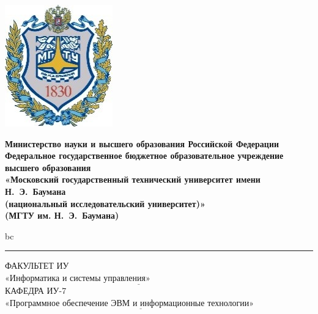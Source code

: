 \begin{titlepage}
	\fontsize{12pt}{12pt}\selectfont
	\noindent \begin{minipage}{0.15\textwidth}
		\includegraphics[width=\linewidth]{img/b_logo.jpg}
	\end{minipage}
	\noindent\begin{minipage}{0.85\textwidth}\centering
		\textbf{Министерство науки и высшего образования Российской Федерации}\\
		\textbf{Федеральное государственное бюджетное образовательное учреждение высшего образования}\\
		\textbf{«Московский государственный технический университет имени Н.~Э.~Баумана}\\
		\textbf{(национальный исследовательский университет)»}\\
		\textbf{(МГТУ им. Н.~Э.~Баумана)}
	\end{minipage}bc
	
	\noindent\rule{17cm}{3pt}
	\newline\newline
	\noindent ФАКУЛЬТЕТ ИУ $\underline{\text{«Информатика и системы управления»~~~~~~~~~~~~~~~~~~~~~~~~~~~~~~~~~~~~~~~~~~~}}$ \newline\newline
	\noindent КАФЕДРА ИУ-7 $\underline{\text{«Программное обеспечение ЭВМ и информационные технологии»~~~~~~~~}}$\newline\newline\newline\newline\newline
	

\end{titlepage}

